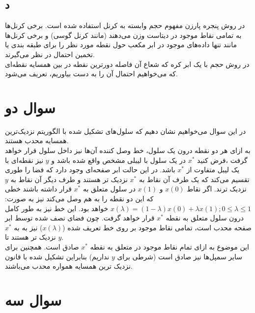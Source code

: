 \documentclass[12pt,onecolumn,a4paper]{article}
\begin{document}
\subsection*{د}
در روش پنجره پارزن مفهوم حجم وابسته به کرنل استفاده شده است. برخی کرنل‌ها به تمامی نقاط موجود در دیتاست وزن می‌دهند (مانند کرنل گوسی) و برخی کرنل‌ها مانند  تنها داده‌های موجود در ابر مکعب حول نقطه مورد نظر را برای طبقه بندی یا تخمین احتمال در نظر می‌گیرند.
\\
در روش  حجم با یک ابر کره که شعاع آن فاصله دورترین نقطه در بین  همسایه نقطه‌ای که می‌خواهیم احتمال آن را به دست بیاوریم، تعریف می‌شود.

\newpage
\section{سوال دو}
در این سوال می‌خواهیم نشان دهیم که سلول‌های  تشکیل شده با الگوریتم نزدیک‌ترین همسایه محدب هستند. \\
به ازای هر دو نقطه درون یک سلول، خط وصل کننده آن‌ها نیز داخل سلول قرار خواهد گرفت ،فرض کنید $x^{*}$ در یک سلول با لیبلی مشخص واقع شده باشد و $y$ نیز نقطه‌ای با یک لیبل متفاوت از $x^{*}$ باشد. در این حالت ابر صفحه‌ای وجود دارد که فضا را طوری تقسیم می‌کند که یک طرف آن نقاط به $x^{*}$ نزدیک تر هستند و طرف دیگر آن نقاط به $y$ نزدیک ترند. اگر نقاط $x(0)$ و $x(1)$ در سلول متعلق به $x^{*}$ قرار داشته باشند خطی که این دو نقطه را به هم وصل می‌کند نیز به صورت: $x(\lambda) = (1 - \lambda)x(0) + \lambda x(1); 0 \leq \lambda \leq 1$ خواهد بود. این خط نیز به طور کامل درون سلول متعلق به نقطه $x^{*}$ قرار خواهد گرفت.
چون فضای نصف شده توسط ابر صفحه محدب است، تمامی نقاط موجود بر روی خط تعریف شده ($x(\lambda)$) نیز به به $x^{*}$ نزدیک تر هستند تا $y$. \\
این موضوع به ازای تمام نقاط موجود در  متعلق به نقطه $x^{*}$ صادق است. همچنین برای سایر سمپل‌ها نیز صادق است (شرطی برای $y$ نداریم) بنابراین  تشکیل شده با قانون نزدیک ترین همسایه همواره محدب می‌باشند.
\newpage
\section{سوال سه}
\end{document}
